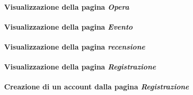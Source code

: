 \paragraph{Visualizzazione della pagina \textit{Opera}}
\label{analisi-casi-uso-attori-principali-utente-generico-14}

\paragraph{Visualizzazione della pagina \textit{Evento}}
\label{analisi-casi-uso-attori-principali-utente-generico-15}

\paragraph{Visualizzazione della pagina \textit{recensione}}
\label{analisi-casi-uso-attori-principali-utente-generico-16}

\paragraph{Visualizzazione della pagina \textit{Registrazione}}
\label{analisi-casi-uso-attori-principali-utente-generico-17}

\paragraph{Creazione di un account dalla pagina \textit{Registrazione}}
\label{analisi-casi-uso-attori-principali-utente-generico-18}

